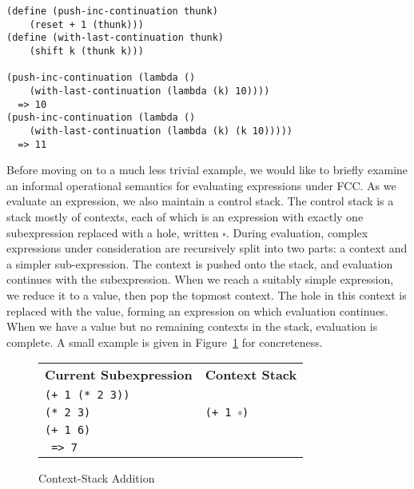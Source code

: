 \documentclass[11pt]{article}
\begin{document}
\begin{verbatim}
(define (push-inc-continuation thunk)
    (reset + 1 (thunk)))
(define (with-last-continuation thunk)
    (shift k (thunk k)))

(push-inc-continuation (lambda ()
    (with-last-continuation (lambda (k) 10))))
  => 10
(push-inc-continuation (lambda ()
    (with-last-continuation (lambda (k) (k 10)))))
  => 11
\end{verbatim}

Before moving on to a much less trivial example, we would like to briefly examine an informal operational semantics for evaluating expressions under FCC.
As we evaluate an expression, we also maintain a control stack.
The control stack is a stack mostly of contexts, each of which is an expression with exactly one subexpression replaced with a hole, written $\square$.
During evaluation, complex expressions under consideration are recursively split into two parts: a context and a simpler sub-expression.
The context is pushed onto the stack, and evaluation continues with the subexpression.
When we reach a suitably simple expression, we reduce it to a value, then pop the topmost context.
The hole in this context is replaced with the value, forming an expression on which evaluation continues.
When we have a value but no remaining contexts in the stack, evaluation is complete.
A small example is given in Figure~\ref{fig:context-stack-addition} for concreteness.

\begin{figure}[H]
\caption{Context-Stack Addition}
\label{fig:context-stack-addition}
\begin{tabular}{ll}
\textbf{Current Subexpression} & \textbf{Context Stack} \\
\texttt{(+ 1 (* 2 3))} & \\
\texttt{(* 2 3)} & \texttt{(+ 1 $\square$)} \\
\texttt{(+ 1 6)} & \\
\texttt{ => 7} & \\
\end{tabular}
\end{figure}
\end{document}

